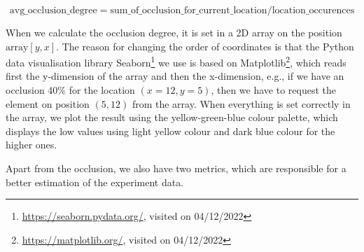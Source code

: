 \begin{equation}
    \textrm{avg\_occlusion\_degree} = \textrm{sum\_of\_occlusion\_for\_current\_location} / \textrm{location\_occurences}\label{eq:avg_occl}
\end{equation}

When we calculate the occlusion degree, it is set in a 2D array on the position $\textrm{array}[y,x]$. The reason for changing the order of coordinates is that the Python data visualisation library Seaborn\footnote{\url{https://seaborn.pydata.org/}, visited on 04/12/2022} we use is based on Matplotlib\footnote{\url{https://matplotlib.org/}, visited on 04/12/2022}, which reads first the y-dimension of the array and then the x-dimension, e.g., if we have an occlusion 40\% for the location $(x=12,y=5)$, then we have to request the element on position $(5,12)$ from the array. When everything is set correctly in the array, we plot the result using the yellow-green-blue colour palette, which displays the low values using light yellow colour and dark blue colour for the higher ones.

Apart from the occlusion, we also have two metrics, which are responsible for a better estimation of the experiment data. 